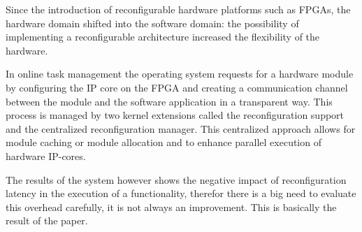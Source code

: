 Since the introduction of reconfigurable hardware platforms such as FPGAs, the hardware domain shifted into the software domain: the possibility of implementing a reconfigurable architecture increased the flexibility of the hardware.

In online task management the operating system requests for a hardware module by configuring the IP core on the FPGA and creating a communication channel between the module and the software application in a transparent way. This process is managed by two kernel extensions called the reconfiguration support and the centralized reconfiguration manager. This centralized approach allows for module caching or module allocation and to enhance parallel execution of hardware IP-cores.

The results of the system however shows the negative impact of reconfiguration latency in the execution of a functionality, therefor there is a big need to evaluate this overhead carefully, it is not always an improvement. This is basically the result of the paper.
